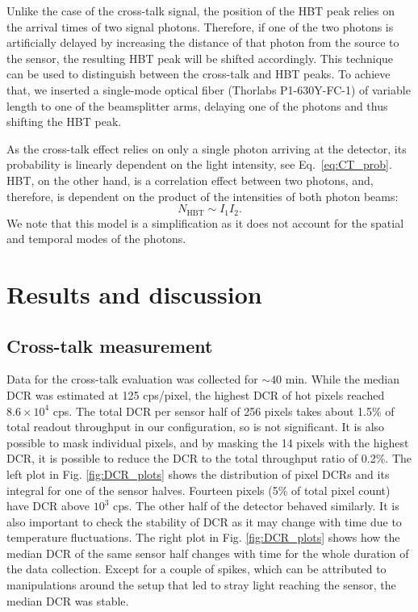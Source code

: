 \documentclass[a4paper,11pt]{article}
\begin{document}
Unlike the case of the cross-talk signal, the position of the HBT peak relies on the arrival times of two signal photons. Therefore, if one of the two photons is artificially delayed by increasing the distance of that photon from the source to the sensor, the resulting HBT peak will be shifted accordingly. This technique can be used to distinguish between the cross-talk and HBT peaks. To achieve that, we inserted a single-mode optical fiber (Thorlabs P1-630Y-FC-1) of variable length to one of the beamsplitter arms, delaying one of the photons and thus shifting the HBT peak.

As the cross-talk effect relies on only a single photon arriving at the detector, its probability is linearly dependent on the light intensity, see Eq.~\eqref{eq:CT_prob}. HBT, on the other hand, is a correlation effect between two photons, and, therefore, is dependent on the product of the intensities of both photon beams:
\begin{equation}
   N_{\mathrm{HBT}}  \sim  I_{1}I_{2}.
   \label{eq:HBT_quad}
\end{equation}
We note that this model is a simplification as it does not account for the spatial and temporal modes of the photons.

\section{Results and discussion}

\subsection{Cross-talk measurement}

Data for the cross-talk evaluation was collected for $\sim 40$ min. While the median DCR was estimated at 125 cps/pixel, the highest DCR of hot pixels reached $8.6\times10^{4}$ cps. The total DCR per sensor half of 256 pixels takes about 1.5\% of total readout throughput in our configuration, so is not significant. It is also possible to mask individual pixels, and by masking the 14 pixels with the highest DCR, it is possible to reduce the DCR to the total throughput ratio of 0.2\%. The left plot in Fig. \ref{fig:DCR_plots} shows the distribution of pixel DCRs and its integral for one of the sensor halves. Fourteen pixels (5\% of total pixel count) have DCR above $10^{3}$ cps. The other half of the detector behaved similarly. It is also important to check the stability of DCR as it may change with time due to temperature fluctuations. The right plot in Fig. \ref{fig:DCR_plots} shows how the median DCR of the same sensor half changes with time for the whole duration of the data collection. Except for a couple of spikes, which can be attributed to manipulations around the setup that led to stray light reaching the sensor, the median DCR was stable.
\end{document}
